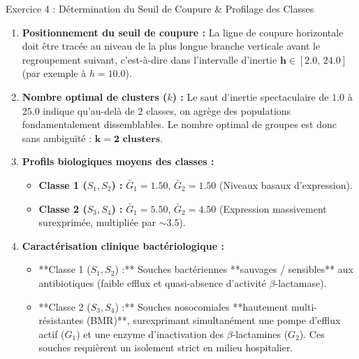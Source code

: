 \documentclass[11pt,a4paper]{article}
\begin{document}
\begin{solutionbox}{Exercice 4 : Détermination du Seuil de Coupure \& Profilage des Classes}
\begin{enumerate}[label=\textbf{\alph*.}]
  \item \textbf{Positionnement du seuil de coupure :}
  La ligne de coupure horizontale doit être tracée au niveau de la plus longue branche verticale avant le regroupement suivant, c'est-à-dire dans l'intervalle d'inertie $\mathbf{h \in [2.0, \, 24.0]}$ (par exemple à $h = 10.0$).

  \item \textbf{Nombre optimal de clusters ($k$) :}
  Le saut d'inertie spectaculaire de $1.0$ à $25.0$ indique qu'au-delà de 2 classes, on agrège des populations fondamentalement dissemblables. Le nombre optimal de groupes est donc sans ambiguïté : $\mathbf{k = 2\text{ clusters}}$.

  \item \textbf{Profils biologiques moyens des classes :}
  \begin{itemize}
    \item \textbf{Classe 1 ($S_1, S_2$) :} $\bar{G}_1 = 1.50$, $\bar{G}_2 = 1.50$ (Niveaux basaux d'expression).
    \item \textbf{Classe 2 ($S_3, S_4$) :} $\bar{G}_1 = 5.50$, $\bar{G}_2 = 4.50$ (Expression massivement surexprimée, multipliée par $\sim 3.5$).
  \end{itemize}

  \item \textbf{Caractérisation clinique bactériologique :}
  \begin{itemize}
    \item **Classe 1 ($S_1, S_2$) :** Souches bactériennes **sauvages / sensibles** aux antibiotiques (faible efflux et quasi-absence d'activité $\beta$-lactamase).
    \item **Classe 2 ($S_3, S_4$) :** Souches nosocomiales **hautement multi-résistantes (BMR)**, surexprimant simultanément une pompe d'efflux actif ($G_1$) et une enzyme d'inactivation des $\beta$-lactamines ($G_2$). Ces souches requièrent un isolement strict en milieu hospitalier.
  \end{itemize}
\end{enumerate}
\end{solutionbox}
\end{document}
